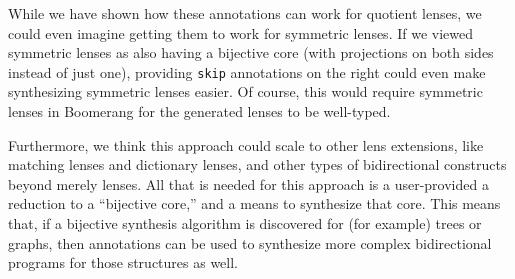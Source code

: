 \documentclass[a4paper]{article}
\begin{document}
While we have shown how these annotations can work for quotient lenses, we could
even imagine getting them to work for symmetric lenses. If we viewed symmetric
lenses as also having a bijective core (with projections on both sides instead
of just one), providing \lstinline{skip} annotations on the right could even
make synthesizing symmetric lenses easier. Of course, this would require
symmetric lenses in Boomerang for the generated lenses to be well-typed.

Furthermore, we think this approach could scale to other lens extensions, like
matching lenses and dictionary lenses, and other types of bidirectional
constructs beyond merely lenses. All that is needed for this approach is a
user-provided a reduction to a ``bijective core,'' and a means to synthesize
that core. This means that, if a bijective synthesis algorithm is discovered for
(for example) trees or graphs, then annotations can be used to synthesize more
complex bidirectional programs for those structures as well.

 

\end{document}
